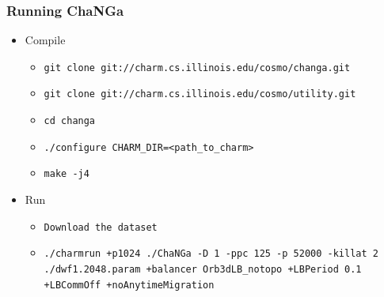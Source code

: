 \begin{frame}
  \frametitle{Running ChaNGa}
  \begin{itemize}
    \item Compile
    \begin{itemize}
      \item \texttt{git clone git://charm.cs.illinois.edu/cosmo/changa.git}
      \item \texttt{git clone git://charm.cs.illinois.edu/cosmo/utility.git}
      \item \texttt{cd changa}
      \item \texttt{./configure CHARM\_DIR=<path\_to\_charm>}
      \item \texttt{make -j4}
    \end{itemize}
    \item Run
    \begin{itemize}
      \item \texttt{Download the dataset}
      \item \texttt{./charmrun +p1024 ./ChaNGa -D 1 -ppc 125 -p 52000 -killat 2 ./dwf1.2048.param
      +balancer Orb3dLB\_notopo +LBPeriod 0.1 +LBCommOff +noAnytimeMigration}
    \end{itemize}
  \end{itemize}
\end{frame}

